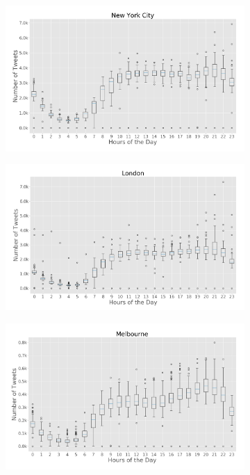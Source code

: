 \begin{figure}[htbp]
	\begin{subfigure}[htbp]{0.45\textwidth}
		\centering
		\includegraphics[width=1\linewidth]{figures/nyc_box_plt_hour_of_day.png}
		\caption{}
		\label{subfig:newyork_box_plot_hour_of_day}
	\end{subfigure}
	\quad
	\begin{subfigure}[htbp]{0.45\textwidth}
		\centering
		\includegraphics[width=1\linewidth]{figures/london_box_plt_hour_of_day.png}
		\caption{}
		\label{subfig:london_box_plot_hour_of_day}
	\end{subfigure}
	
	\medskip
	
	\begin{subfigure}[htbp]{0.45\textwidth}
		\centering
		\includegraphics[width=1\linewidth]{figures/melbourne_box_plt_hour_of_day.png}
		\caption{}
		\label{subfig:melbourne_box_plot_hour_of_day}
	\end{subfigure}
	

\end{figure}
